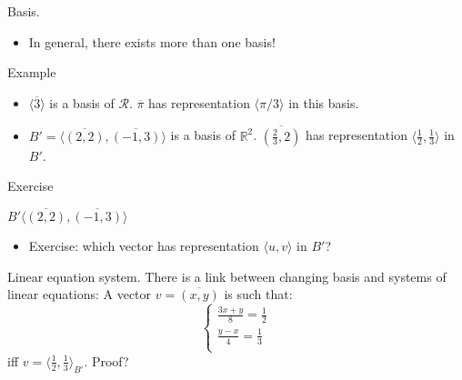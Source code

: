 \documentclass{beamer}
\begin{document}
\begin{frame}{Basis.}
  \begin{itemize}
  \item \alert{In general, there exists more than one basis!}
  \end{itemize}

  \begin{exampleblock}{Example}
    \begin{itemize}
    \item $\langle \overline 3 \rangle$ is a basis of $\mathcal{R}$. $\overline{\pi}$ has representation $\langle \pi/3 \rangle$ in this basis.
    \item $B' = \langle \overline {(2,2)}, \overline{(-1,3)}  \rangle$ is a basis of $\mathbb{R}^2$. $\overline{(\frac{2}{3}, 2)}$ has representation $\langle \frac{1}{2}, \frac{1}{3} \rangle$ in $B'$.
    \end{itemize}
    \end{exampleblock}

    \begin{center}
            
    \end{center}
  
  \end{frame}

\begin{frame}{Exercise}
  \begin{exampleblock}{$B' \langle \overline{(2,2)}, \overline{(-1, 3)} \rangle$}
    \begin{itemize}
    \item Exercise: which vector has representation $\langle u, v \rangle$ in $B'$?
    \end{itemize}
  \end{exampleblock}
\end{frame}

\begin{frame}{Linear equation system.}
  There is a link between changing basis and systems of linear equations:
  A vector $v = \overline{(x, y)}$ is such that:
  \[
  \left \{
  \begin{array}{l}
    \frac{3x + y}{8} = \frac{1}{2}\\
    \frac{y - x}{4} = \frac{1}{3}\\
  \end{array}
  \right .
  \]
  iff $v = \langle \frac{1}{2}, \frac{1}{3} \rangle_{B'}$. Proof?
\end{frame}
\end{document}
